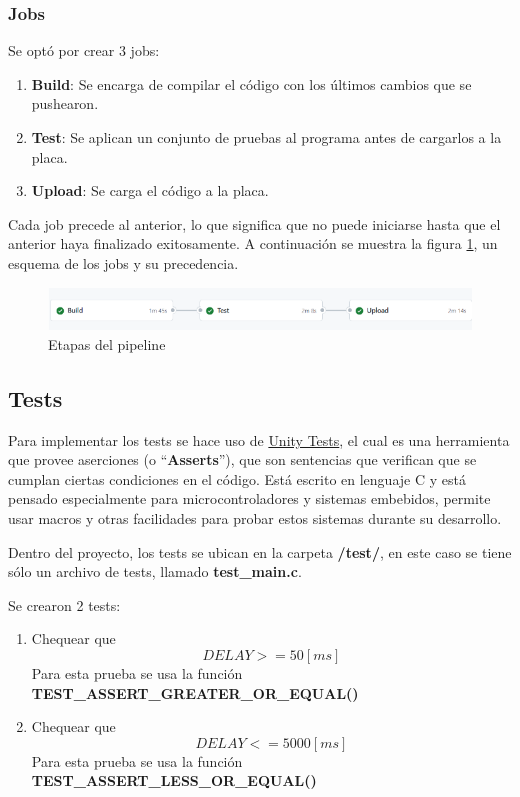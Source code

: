 \subsubsection{Jobs}
Se optó por crear 3 jobs:
\begin{enumerate}
\item \textbf{Build}: Se encarga de compilar el código con los últimos cambios que se pushearon.
\item \textbf{Test}: Se aplican un conjunto de pruebas al programa antes de cargarlos a la placa.
\item \textbf{Upload}: Se carga el código a la placa.
\end{enumerate}

Cada job precede al anterior, lo que significa que no puede iniciarse hasta que el anterior haya finalizado exitosamente. A continuación se muestra la figura \ref{fig:pipeline3}, un esquema de los jobs y su precedencia.

\begin{figure}[H]
    \centering
    \includegraphics[width=1\textwidth]{fig/pipeline_log.png}
    \caption{Etapas del pipeline}
    \label{fig:pipeline3}
\end{figure}
\subsection{Tests}
Para implementar los tests se hace uso de \href{http://www.throwtheswitch.org/unity}{Unity Tests}, el cual es una herramienta que provee aserciones (o ``\textbf{Asserts}''), que son sentencias que verifican que se cumplan ciertas condiciones en el código. Está escrito en lenguaje C y está pensado especialmente para microcontroladores y sistemas embebidos, permite usar macros y otras facilidades para probar estos sistemas durante su desarrollo.

Dentro del proyecto, los tests se ubican en la carpeta \textbf{/test/}, en este caso se tiene sólo un archivo de tests, llamado \textbf{test\_main.c}.

Se crearon 2 tests:
\begin{enumerate}
\item Chequear que $$DELAY >= 50 [ms] $$
Para esta prueba se usa la función \textbf{TEST\_ASSERT\_GREATER\_OR\_EQUAL()}
\item Chequear que $$ DELAY <= 5000 [ms] $$
Para esta prueba se usa la función \textbf{TEST\_ASSERT\_LESS\_OR\_EQUAL()}
\end{enumerate}

